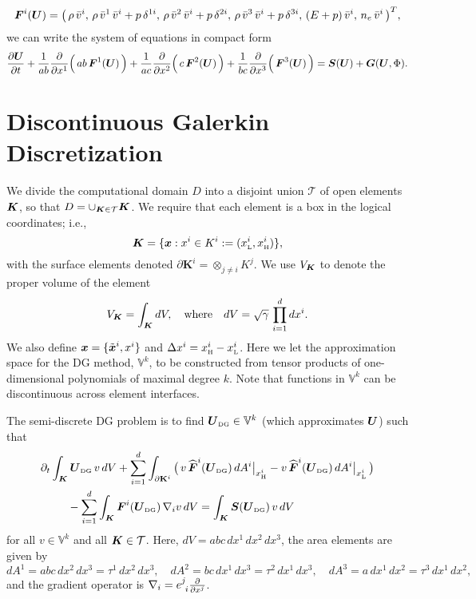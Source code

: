 \documentclass[10pt,preprint]{aastex}
\newcommand{\dx}{\Delta x}
\newcommand{\pbK}{\partial\mathbf{K}}
\newcommand{\UDG}{\bU_{\mbox{\tiny DG}}}
\newcommand{\sumx}{\sum_{i=1}^{d}}
\begin{document}
\begin{equation}
  \boldsymbol{F}^{i}(\boldsymbol{U})
  =\big(\,\rho\,\bar{v}^{i},\,\rho\,\bar{v}^{1}\,\bar{v}^{i}+p\,\delta^{1i},\,\rho\,\bar{v}^{2}\,\bar{v}^{i}+p\,\delta^{2i},\,\rho\,\bar{v}^{3}\,\bar{v}^{i}+p\,\delta^{3i},\,(E+p)\,\bar{v}^{i},\,n_{e}\,\bar{v}^{i}\,\big)^{T},
\end{equation}
we can write the system of equations in compact form
\begin{equation}
  \frac{\partial \boldsymbol{U}}{\partial t}
  +\frac{1}{ab}\frac{\partial }{\partial x^{1}}\Big(\,ab\,\boldsymbol{F}^{1}(\boldsymbol{U})\,\Big)
  +\frac{1}{ac}\frac{\partial }{\partial x^{2}}\Big(\,c\,\boldsymbol{F}^{2}(\boldsymbol{U})\,\Big)
  +\frac{1}{bc}\frac{\partial }{\partial x^{3}}\Big(\,\boldsymbol{F}^{3}(\boldsymbol{U})\,\Big)
  =\boldsymbol{S}(\boldsymbol{U})+\boldsymbol{G}(\boldsymbol{U},\Phi).
  \label{eq:extendedEulerCompact}
\end{equation}

\section{Discontinuous Galerkin Discretization}

We divide the computational domain $D$ into a disjoint union $\mathcal{T}$ of open elements $\boldsymbol{K}$, so that $D = \cup_{\boldsymbol{K} \in \mathcal{T}}\boldsymbol{K}$.  
We require that each element is a box in the logical coordinates; i.e.,
\begin{equation}
  \boldsymbol{K}=\{\boldsymbol{x} : x^{i} \in K^{i} := (x_{\mbox{\tiny L}}^{i},x_{\mbox{\tiny H}}^{i})\}, 
\end{equation}
with the surface elements denoted $\pbK^{i}=\otimes_{j\ne i}K^{j}$.  
We use $V_{\boldsymbol{K}}$ to denote the proper volume of the element
\begin{equation}
  V_{\boldsymbol{K}} = \int_{\boldsymbol{K}}dV, \quad\text{where}\quad dV = \sqrt{\gamma}\,\prod_{i=1}^{d}dx^{i}.  
\end{equation}
We also define $\boldsymbol{x}=\{\tilde{\boldsymbol{x}}^{i},x^{i}\}$ and $\dx^{i}=\xH^{i}-\xL^{i}$.  
Here we let the approximation space for the DG method, $\mathbb{V}^{k}$, to be constructed from tensor products of one-dimensional polynomials of maximal degree $k$.  
Note that functions in $\mathbb{V}^{k}$ can be discontinuous across element interfaces. 

The semi-discrete DG problem is to find $\UDG\in\mathbb{V}^{k}$ (which approximates $\boldsymbol{U}$) such that
\begin{align}
  &\partial_{t}\int_{\bK}\UDG\,v\,dV
  +\sumx\int_{\pbK^{i}}\big(\,v\,\widehat{\vect{F}}^{i}(\UDG)\,dA^{i}\big|_{\xH^{i}}-v\,\widehat{\vect{F}}^{i}(\UDG)\,dA^{i}\big|_{\xL^{i}}\,\big) \nonumber \\
  &\hspace{24pt}
  -\sumx\int_{\bK}\vect{F}^{i}(\UDG)\,\nabla_{i}v\,dV
  =\int_{\bK}\vect{S}(\UDG)\,v\,dV
  \label{eq:semidiscreteDG}
\end{align}
for all $v\in\mathbb{V}^{k}$ and all $\boldsymbol{K}\in\mathcal{T}$.  
Here, $dV=abc\,dx^{1}\,dx^{2}\,dx^{3}$, the area elements are given by
\begin{equation}
  dA^{1}=abc\,dx^{2}\,dx^{3}=\tau^{1}\,dx^{2}\,dx^{3}, \quad
  dA^{2}=bc\,dx^{1}\,dx^{3}=\tau^{2}\,dx^{1}\,dx^{3}, \quad
  dA^{3}=a\,dx^{1}\,dx^{2}=\tau^{3}\,dx^{1}\,dx^{2}, 
\end{equation}
and the gradient operator is $\nabla_{i}=e^{j}_{~i}\frac{\partial }{\partial x^{j}}$.  
\end{document}
